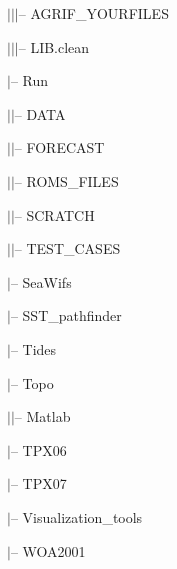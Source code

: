 $|$\hspace{0.5cm}$|$\hspace{0.5cm}$|$-- AGRIF\_YOURFILES

$|$\hspace{0.5cm}$|$\hspace{0.5cm}$|$-- LIB.clean

$|$-- Run

$|$\hspace{0.5cm}$|$-- DATA


$|$\hspace{0.5cm}$|$-- FORECAST

$|$\hspace{0.5cm}$|$-- ROMS\_FILES

$|$\hspace{0.5cm}$|$-- SCRATCH

$|$\hspace{0.5cm}$|$-- TEST\_CASES

$|$-- SeaWifs

$|$-- SST\_pathfinder

$|$-- Tides

$|$-- Topo

$|$\hspace{0.5cm}$|$-- Matlab

$|$-- TPX06

$|$-- TPX07

$|$-- Visualization\_tools

$|$-- WOA2001

